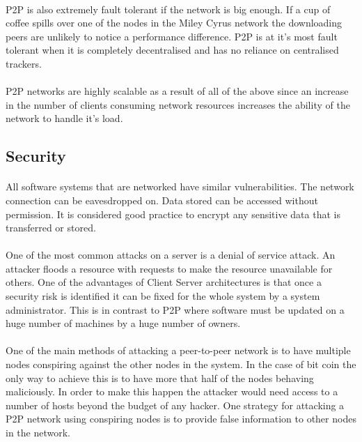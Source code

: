 \documentclass[11pt]{amsart}
\begin{document}
\paragraph{}
P2P is also extremely fault tolerant if the network is big enough. If a cup of coffee spills over one of the nodes in the Miley Cyrus network the downloading peers are unlikely to notice a performance difference.
P2P is at it's most fault tolerant when it is completely decentralised and has no reliance on centralised trackers.

\paragraph{}
P2P networks are highly scalable as a result of all of the above since an increase in the number of clients consuming network resources increases the ability of the network to handle it's load. 

\subsection{Security}
\paragraph{}
All software systems that are networked have similar vulnerabilities. The network connection can be eavesdropped on. Data stored can be accessed without permission. It is considered good practice to encrypt any sensitive data that is transferred or stored.
\paragraph{}
One of the most common attacks on a server is a denial of service attack. An attacker floods a resource with requests to make the resource unavailable for others.\cite{DistSys} One of the advantages of Client Server architectures is that once a security risk is identified it can be fixed for the whole system by a system administrator. This is in contrast to P2P where software must be updated on a huge number of machines by a huge number of owners.
\paragraph{}
One of the main methods of attacking a peer-to-peer network is to have multiple nodes conspiring against the other nodes in the system. In the case of bit coin the only way to achieve this is to have more that half of the nodes behaving maliciously.\cite{bitcoin} In order to make this happen the attacker would need access to a number of hosts beyond the budget of any hacker. One strategy for attacking a P2P network using conspiring nodes is to provide false information to other nodes in the network.
\end{document}
